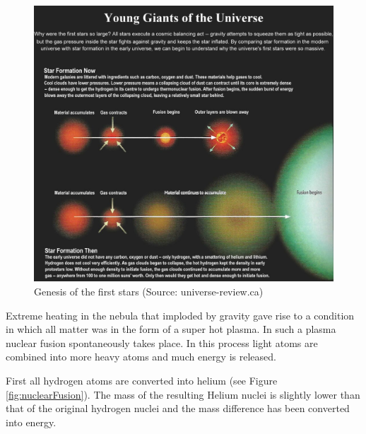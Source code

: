 \documentclass[
  11pt,
]{book}
\begin{document}
\begin{figure}

{\centering \includegraphics[width=1\linewidth]{./figs/I08-13-firststars6} 

}

\caption{Genesis of the first stars (Source: universe-review.ca)}\label{fig:genesisStar}
\end{figure}

Extreme heating in the nebula that imploded by gravity gave rise to a condition in which all matter was in the form of a super hot plasma.
In such a plasma nuclear fusion spontaneously takes place. In this process light atoms are combined into more heavy atoms and much energy is released.

First all hydrogen atoms are converted into helium (see Figure \ref{fig:nuclearFusion}). The mass of the resulting Helium nuclei is slightly lower than that of the original hydrogen nuclei and the mass difference has been converted into energy.
\end{document}
